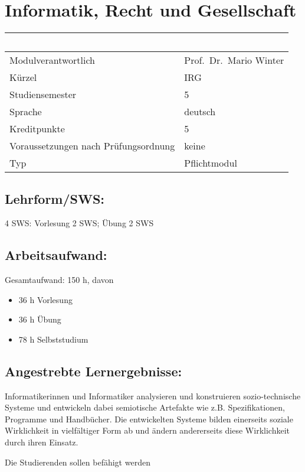 \chapter{Informatik, Recht und
Gesellschaft}\label{informatik-recht-und-gesellschaft}

\begin{longtable}[]{@{}ll@{}}
\toprule
~ & ~\tabularnewline
\midrule
\endhead
Modulverantwortlich & Prof.~Dr.~Mario Winter\tabularnewline
Kürzel & IRG\tabularnewline
Studiensemester & 5\tabularnewline
Sprache & deutsch\tabularnewline
Kreditpunkte & 5\tabularnewline
Voraussetzungen nach Prüfungsordnung & keine\tabularnewline
Typ & Pflichtmodul\tabularnewline
\bottomrule
\end{longtable}

\section*{Lehrform/SWS:}\label{lehrformsws-16}

4 SWS: Vorlesung 2 SWS; Übung 2 SWS

\section*{Arbeitsaufwand:}\label{arbeitsaufwand-15}

Gesamtaufwand: 150 h, davon

\begin{itemize}
\item
  36 h Vorlesung
\item
  36 h Übung
\item
  78 h Selbststudium
\end{itemize}

\section*{Angestrebte
Lernergebnisse:}\label{angestrebte-lernergebnisse-16}

Informatikerinnen und Informatiker analysieren und konstruieren
sozio-technische Systeme und entwickeln dabei semiotische Artefakte wie
z.B. Spezifikationen, Programme und Handbücher. Die entwickelten Systeme
bilden einerseits soziale Wirklichkeit in vielfältiger Form ab und
ändern andererseits diese Wirklichkeit durch ihren Einsatz.

Die Studierenden sollen befähigt werden

